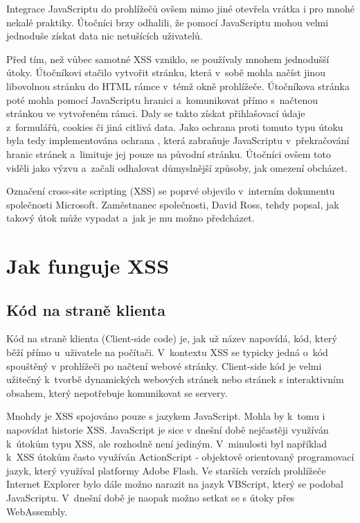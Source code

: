 \documentclass[11pt, conference, a4paper]{IEEEtran}
\begin{document}
Integrace JavaScriptu do prohlížečů ovšem mimo jiné otevřela vrátka i pro mnohé nekalé praktiky. Útočníci brzy odhalili, že pomocí JavaScriptu mohou velmi jednoduše získat data nic netušících uživatelů. 

Před tím, než vůbec samotné XSS vzniklo, se používaly mnohem jednodušší útoky. Útočníkovi stačilo vytvořit stránku, která v~sobě mohla načíst jinou libovolnou stránku do HTML rámce v~témž okně prohlížeče. Útočníkova stránka poté mohla pomocí JavaScriptu  hranici a~komunikovat přímo s~načtenou stránkou ve vytvořeném rámci. Daly se takto získat přihlašovací údaje z~formulářů, cookies či jiná citlivá data. Jako ochrana proti tomuto typu útoku byla tedy implementována ochrana , která zabraňuje JavaScriptu v~překračování hranic stránek a~limituje jej pouze na původní stránku. Útočníci ovšem toto viděli jako výzvu a~začali odhalovat důmyslnější způsoby, jak omezení obcházet.

Označení cross-site scripting (XSS) se poprvé objevilo  v~interním dokumentu  společnosti Microsoft. Zaměstnanec společnosti, David Ross, tehdy popsal, jak takový útok může vypadat a~jak je mu možno předcházet.~\cite{Grossman2007}


\section{Jak funguje XSS}
\subsection{Kód na straně klienta}
Kód na straně klienta (Client-side code) je, jak už název napovídá, kód, který běží přímo u~uživatele na počítači. V~kontextu XSS se typicky jedná o~kód spouštěný v prohlížeči po načtení webové stránky. Client-side kód je velmi užitečný k~tvorbě dynamických webových stránek nebo stránek s interaktivním obsahem, který nepotřebuje komunikovat se servery.~\cite{XSS-cloudflare}

Mnohdy je XSS spojováno pouze s jazykem JavaScript. Mohla by k~tomu i napovídat historie XSS. JavaScript je sice v dnešní době nejčastěji využíván k~útokům typu XSS, ale rozhodně není jediným. V~minulosti byl například k~XSS útokům často využíván ActionScript - objektově orientovaný programovací jazyk, který využíval platformy Adobe Flash. Ve starších verzích prohlížeče Internet Explorer bylo dále možno narazit na jazyk VBScript, který se podobal JavaScriptu. V~dnešní době je naopak možno setkat se s útoky přes WebAssembly.
\end{document}
